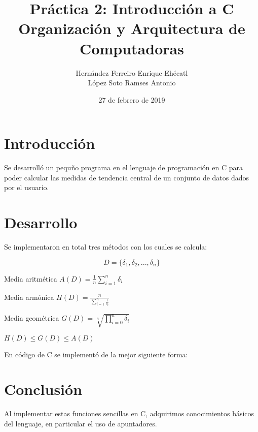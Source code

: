 \documentclass[12pt, letterpaper]{article}
\author{Hernández Ferreiro Enrique Ehécatl \\
          López Soto Ramses Antonio}
\title{Práctica 2: Introducción a C \\
                {\small Organización y Arquitectura de Computadoras}}
\date{27 de febrero de 2019}
\begin{document}
    \maketitle
    \section{Introducción}
    Se desarrolló un pequño programa en el lenguaje de programación en C para
    poder calcular las medidas de tendencia central de un conjunto de datos dados
    por el usuario.
    \section{Desarrollo}
    Se implementaron en total tres métodos con los cuales se calcula:
    \begin{center}
    \end{center}

    $$D=\{\delta_1, \delta_2, ..., \delta_n\}$$

    \begin{center}
            Media aritmética   \hspace{2cm}   $A(D)=\frac{1}{n}\displaystyle\sum_{i=1}^{n}\delta_{i}$
    \end{center}

    \begin{center}
            Media armónica   \hspace{2cm}   $H(D)=\frac{n}{\displaystyle\sum_{i=1}^{n}\frac{1}{\delta_{i}}}$
    \end{center}

    \begin{center}
            Media geométrica   \hspace{2cm}   $G(D)=\sqrt[n]{\displaystyle\prod_{i=0}^{n}\delta_{i}}$
    \end{center}

    \begin{center}
            $H(D) \leq G(D) \leq A(D)$
    \end{center}

    En código de C se implementó de la mejor siguiente forma:

    
    \section{Conclusión}
    Al implementar estas funciones sencillas en C, adquirimos conocimientos básicos
    del lenguaje, en particular el uso de apuntadores.
  
\end{document}
